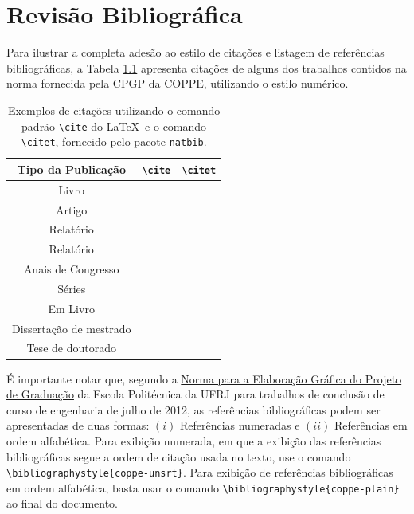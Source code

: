 \documentclass[grad,numbers]{coppe}
\begin{document}
  \chapter{Revisão Bibliográfica}

  Para ilustrar a completa adesão ao estilo de citações e listagem de
  referências bibliográficas, a Tabela \ref{tab:citation} apresenta citações de alguns dos trabalhos contidos na norma fornecida pela CPGP da
  COPPE, utilizando o estilo numérico.

  \begin{table}[h]
  \caption{Exemplos de citações utilizando o comando padrão
    \texttt{\textbackslash cite} do \LaTeX\ e
    o comando \texttt{\textbackslash citet},
    fornecido pelo pacote \texttt{natbib}.}
  \label{tab:citation}
  \centering
  {\footnotesize
  \begin{tabular}{|c|c|c|}
    \hline
    Tipo da Publicação & \verb|\cite| & \verb|\citet|\\
    \hline
    Livro & \cite{book-example} & \citet{book-example}\\
    Artigo & \cite{article-example} & \citet{article-example}\\
    Relatório & \cite{techreport-example} & \citet{techreport-example}\\
    Relatório & \cite{techreport-exampleIn} & \citet{techreport-exampleIn}\\
    Anais de Congresso & \cite{inproceedings-example} &
      \citet{inproceedings-example}\\
    Séries & \cite{incollection-example} & \citet{incollection-example}\\
    Em Livro & \cite{inbook-example} & \citet{inbook-example}\\
    Dissertação de mestrado & \cite{mastersthesis-example} &
      \citet{mastersthesis-example}\\
    Tese de doutorado & \cite{phdthesis-example} & \citet{phdthesis-example}\\
    \hline
  \end{tabular}}
  \end{table}
  
  É importante notar que, segundo a \href{http://www.poli.ufrj.br/graduacao_projeto.php}{Norma para a Elaboração Gráfica do Projeto de Graduação} da Escola Politécnica da UFRJ para trabalhos de conclusão de curso de engenharia de julho de 2012, as referências bibliográficas podem ser apresentadas de duas formas: $(i)$ Referências numeradas e $(ii)$ Referências em ordem alfabética. Para exibição numerada, em que a exibição das referências bibliográficas segue a ordem de citação usada no texto, use o comando \texttt{\textbackslash bibliographystyle\{coppe-unsrt\}}. Para exibição de referências bibliográficas em ordem alfabética, basta usar o comando \texttt{\textbackslash bibliographystyle\{coppe-plain\}} ao final do documento. 
  
\end{document}
